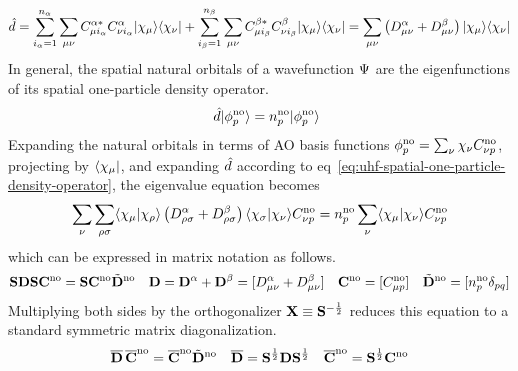 \documentclass[11pt,fleqn]{article}
\begin{document}
\begin{align}
\label{eq:uhf-spatial-one-particle-density-operator}
  \op{d}
=
  \sum_{i_\a=1}^{n_\a}
  \sum_{\mu\nu}
  C_{\mu i_\a}^{\a*} C_{\nu i_\a}^\a
  \kt{\x_\mu}\br{\x_\nu}
+
  \sum_{i_\b=1}^{n_\b}
  \sum_{\mu\nu}
  C_{\mu i_\b}^{\b*} C_{\nu i_\b}^\b
  \kt{\x_\mu}\br{\x_\nu}
=
  \sum_{\mu\nu}
  \pr{
    D^\a_{\mu\nu}
  +
    D^\b_{\mu\nu}
  }
  \kt{\x_\mu}\br{\x_\nu}
\end{align}
In general, the spatial natural orbitals of a wavefunction $\Psi $ are the eigenfunctions of its spatial one-particle density operator.
\begin{align*}
&&
  \hat{d}
  |\phi _p^{\mathrm{no}}\rangle
=
  n_p^{\mathrm{no}}
  |\phi _p^{\mathrm{no}}\rangle
\end{align*}
Expanding the natural orbitals in terms of AO basis functions $\f_p^{\mr{no}}=\sum_\nu \x_\nu C_{\nu p}^{\mr{no}}$, projecting by $\br{\x_\mu}$, and expanding $\hat{d}$ according to eq~\ref{eq:uhf-spatial-one-particle-density-operator}, the eigenvalue equation becomes
\begin{align*}
  \sum_\nu
  \sum_{\rh\si}
  \ip{\x_\mu|\x_\rh}
  \pr{
    D^\a_{\rh\si}
  +
    D^\b_{\rh\si}
  }
  \ip{\x_\si|\x_\nu}
  C_{\nu p}^{\mr{no}}
=
  n_p^{\mr{no}}
  \sum_\nu
  \ip{\x_\mu|\x_\nu}
  C_{\nu p}^{\mr{no}}
\end{align*}
which can be expressed in matrix notation as follows.
\begin{align*}
  \bo{S}
  \bo{D}
  \bo{S}
  \bo{C}^{\mr{no}}
=
  \bo{S}
  \bo{C}^{\mr{no}}
  \tl{\bo{D}}^{\mr{no}}
&&
  \bo{D}
=
  \bo{D}^\a + \bo{D}^\b
=
  [D_{\mu\nu}^\a + D_{\mu\nu}^\b]
&&
  \bo{C}^{\mr{no}}
=
  [C_{\mu p}^{\mr{no}}]
&&
  \tl{\bo{D}}^{\mr{no}}
=
  [n_p^{\mr{no}} \d_{pq}]
\end{align*}
Multiplying both sides by the orthogonalizer $\mathbf{X}\equiv\mathbf{S}^{-\frac {1}{2}}$ reduces this equation to a standard symmetric matrix diagonalization.
\begin{align*}
  \overline{\mathbf{D}}\,
  \overline{\mathbf{C}}^{\mathrm{no}}
=
  \overline{\mathbf{C}}^{\mathrm{no}}
  \tilde{\mathbf{D}}^{\mathrm{no}}
&&
  \overline{\mathbf{D}}
=
  \mathbf{S}^{\frac {1}{2}}\mathbf{D}\mathbf{S}^{\frac {1}{2}}
&&
  \overline{\mathbf{C}}^{\mathrm{no}}
=
  \mathbf{S}^{\frac {1}{2}}\mathbf{C}^{\mathrm{no}}
\end{align*}
\end{document}
